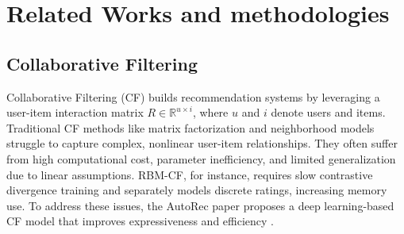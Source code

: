 \documentclass{ieeetj}
\begin{document}
\section{Related Works and methodologies}

\subsection{Collaborative Filtering}

Collaborative Filtering (CF) builds recommendation systems by leveraging a user-item interaction matrix \( R \in \mathbb{R}^{u \times i} \), where \( u \) and \( i \) denote users and items. Traditional CF methods like matrix factorization and neighborhood models struggle to capture complex, nonlinear user-item relationships. They often suffer from high computational cost, parameter inefficiency, and limited generalization due to linear assumptions. RBM-CF, for instance, requires slow contrastive divergence training and separately models discrete ratings, increasing memory use. To address these issues, the AutoRec paper proposes a deep learning-based CF model that improves expressiveness and efficiency \cite{sedhain2015autorec}.
\end{document}
